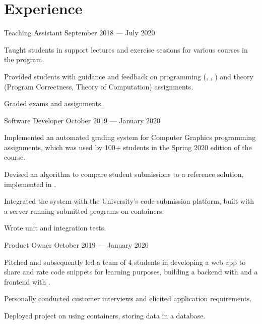 \section*{Experience}

\begin{cventries}
	{Teaching Assistant}
	{September 2018 --- July 2020} %
	{}
	{%
		\begin{cvitems}
		\item Taught students in support lectures and exercise sessions for various courses in the program.
		\item Provided students with guidance and feedback on programming (, , ) and theory\\ (Program Correctness, Theory of Computation) assignments.
		\item Graded exams and assignments.
		\end{cvitems}
	}
	{Software Developer}
	{October 2019 --- January 2020} %
	{}
	{
		\begin{cvitems}
		\item Implemented an automated grading system for Computer Graphics programming assignments, which was used by 100+ students in the Spring 2020 edition of the course.
		\item Devised an algorithm to compare student submissions to a reference solution, implemented in \cvlanguage{C++}.
		\item Integrated the system with the University's code submission platform, built with a  server running submitted programs on  containers.
		\item Wrote unit and integration tests.
		\end{cvitems}
	}
	{Product Owner}
	{October 2019 --- January 2020} %
	{}
	{%
		\begin{cvitems}
		\item Pitched and subsequently led a team of 4 students in developing a web app to share and rate code snippets for learning purposes, building a  backend with  and a  frontend with \cvlanguage{Vue}.
		\item Personally conducted customer interviews and elicited application requirements.
		\item Deployed project on  using  containers, storing data in a  database.

\end{cvitems}}
\end{cventries}
